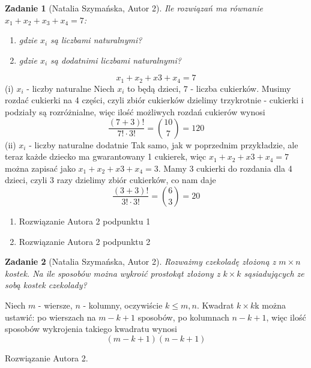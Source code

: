\documentclass{mwart}
\newtheorem{zad}{Zadanie}[section]
\begin{document}
\begin{zad}[Natalia Szymańska, Autor 2]
    Ile rozwiązań ma równanie $x_1 + x_2+x_3+x_4 = 7$:
    \begin{enumerate}
        \item gdzie $x_i$ są liczbami naturalnymi?
        \item gdzie $x_i$ są dodatnimi liczbami naturalnymi?
    \end{enumerate}
\end{zad}
\begin{mdframed}
    \begin{enumerate}
       \[x_{1}+x_{2}+x{3}+x_{4}=7\]
(i) $x_{i}$ - liczby naturalne
Niech $x_{i}$ to będą dzieci, $7$ - liczba cukierków. Musimy rozdać cukierki na 4 części, czyli zbiór cukierków dzielimy trzykrotnie - cukierki i podziały są rozróżnialne, więc ilość możliwych rozdań cukierów wynosi \[\frac{(7+3)!}{7!\cdot3!} = {{10}\choose{7}} = 120\]
(ii) $x_{i}$ - liczby naturalne dodatnie
Tak samo, jak w poprzednim przykładzie, ale teraz każde dziecko ma gwarantowany 1 cukierek, więc $x_{1}+x_{2}+x{3}+x_{4}=7$ można zapisać jako $x_{1}+x_{2}+x{3}+x_{4}=3$. Mamy 3 cukierki do rozdania dla 4 dzieci, czyli 3 razy dzielimy zbiór cukierków, co nam daje \[\frac{(3+3)!}{3!\cdot3!} = {{6}\choose{3}} = 20\]
    \end{enumerate}
\end{mdframed}
\begin{mdframed}
    \begin{enumerate}
        \item Rozwiązanie Autora 2 podpunktu 1
        \item Rozwiązanie Autora 2 podpunktu 2
    \end{enumerate}
\end{mdframed}




\begin{zad}[Natalia Szymańska, Autor 2]
    Rozważmy czekoladę złożoną z $m\times n$ kostek.
    Na ile sposobów można wykroić prostokąt złożony z $k \times k$
    sąsiadujących ze sobą kostek czekolady?
\end{zad}
\begin{mdframed}
    Niech $m$ - wiersze, $n$ - kolumny, oczywiście $k \leq m, n$. Kwadrat $k \times k$k można ustawić: po wierszach na $m-k+1$ sposobów, po kolumnach $n-k+1$, więc ilość sposobów wykrojenia takiego kwadratu wynosi \[(m-k+1)(n-k+1)\]

\end{mdframed}
\begin{mdframed}
    Rozwiązanie Autora 2.
\end{mdframed}
\end{document}
